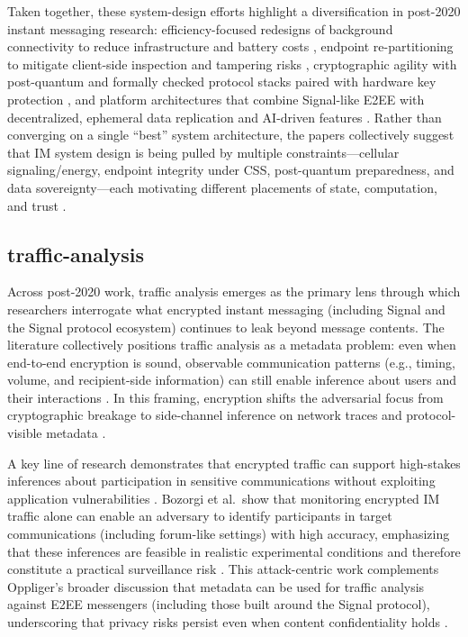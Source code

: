 Taken together, these system-design efforts highlight a diversification in post-2020 instant messaging research: efficiency-focused redesigns of background connectivity to reduce infrastructure and battery costs \cite{yi2020}, endpoint re-partitioning to mitigate client-side inspection and tampering risks \cite{alsop2025}, cryptographic agility with post-quantum and formally checked protocol stacks paired with hardware key protection \cite{r2025}, and platform architectures that combine Signal-like E2EE with decentralized, ephemeral data replication and AI-driven features \cite{kanimozhi2025}. Rather than converging on a single “best” system architecture, the papers collectively suggest that IM system design is being pulled by multiple constraints—cellular signaling/energy, endpoint integrity under CSS, post-quantum preparedness, and data sovereignty—each motivating different placements of state, computation, and trust \cite{yi2020,alsop2025,r2025,kanimozhi2025}.

\subsection{traffic-analysis}

Across post-2020 work, traffic analysis emerges as the primary lens through which researchers interrogate what encrypted instant messaging (including Signal and the Signal protocol ecosystem) continues to leak beyond message contents. The literature collectively positions traffic analysis as a metadata problem: even when end-to-end encryption is sound, observable communication patterns (e.g., timing, volume, and recipient-side information) can still enable inference about users and their interactions \cite{oppliger2020,bozorgi2023,brigham2025}. In this framing, encryption shifts the adversarial focus from cryptographic breakage to side-channel inference on network traces and protocol-visible metadata \cite{oppliger2020,bozorgi2023}.

A key line of research demonstrates that encrypted traffic can support high-stakes inferences about participation in sensitive communications without exploiting application vulnerabilities \cite{bozorgi2023}. Bozorgi et al.\ show that monitoring encrypted IM traffic alone can enable an adversary to identify participants in target communications (including forum-like settings) with high accuracy, emphasizing that these inferences are feasible in realistic experimental conditions and therefore constitute a practical surveillance risk \cite{bozorgi2023}. This attack-centric work complements Oppliger's broader discussion that metadata can be used for traffic analysis against E2EE messengers (including those built around the Signal protocol), underscoring that privacy risks persist even when content confidentiality holds \cite{oppliger2020}.

